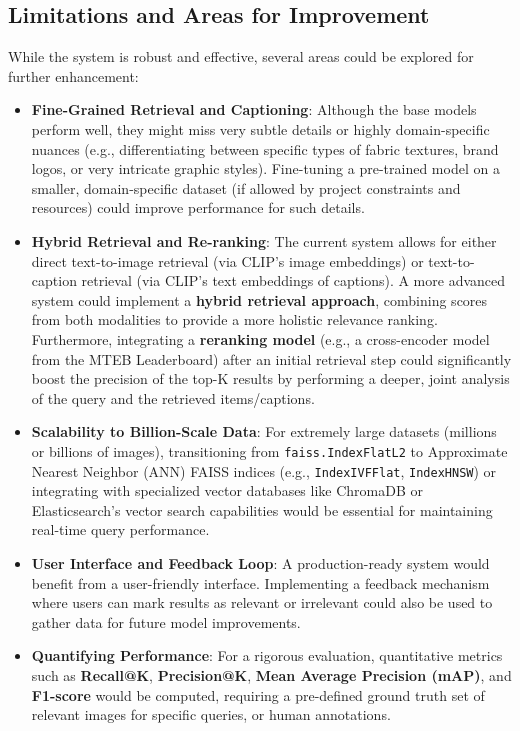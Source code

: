 \documentclass{article}
\begin{document}
\subsection{Limitations and Areas for Improvement}
While the system is robust and effective, several areas could be explored for further enhancement:
\begin{itemize}
    \item \textbf{Fine-Grained Retrieval and Captioning}: Although the base models perform well, they might miss very subtle details or highly domain-specific nuances (e.g., differentiating between specific types of fabric textures, brand logos, or very intricate graphic styles). Fine-tuning a pre-trained model on a smaller, domain-specific dataset (if allowed by project constraints and resources) could improve performance for such details.
    \item \textbf{Hybrid Retrieval and Re-ranking}: The current system allows for either direct text-to-image retrieval (via CLIP's image embeddings) or text-to-caption retrieval (via CLIP's text embeddings of captions). A more advanced system could implement a \textbf{hybrid retrieval approach}, combining scores from both modalities to provide a more holistic relevance ranking. Furthermore, integrating a \textbf{reranking model} (e.g., a cross-encoder model from the MTEB Leaderboard) after an initial retrieval step could significantly boost the precision of the top-K results by performing a deeper, joint analysis of the query and the retrieved items/captions.
    \item \textbf{Scalability to Billion-Scale Data}: For extremely large datasets (millions or billions of images), transitioning from \texttt{faiss.IndexFlatL2} to Approximate Nearest Neighbor (ANN) FAISS indices (e.g., \texttt{IndexIVFFlat}, \texttt{IndexHNSW}) or integrating with specialized vector databases like ChromaDB or Elasticsearch's vector search capabilities would be essential for maintaining real-time query performance.
    \item \textbf{User Interface and Feedback Loop}: A production-ready system would benefit from a user-friendly interface. Implementing a feedback mechanism where users can mark results as relevant or irrelevant could also be used to gather data for future model improvements.
    \item \textbf{Quantifying Performance}: For a rigorous evaluation, quantitative metrics such as \textbf{Recall@K}, \textbf{Precision@K}, \textbf{Mean Average Precision (mAP)}, and \textbf{F1-score} would be computed, requiring a pre-defined ground truth set of relevant images for specific queries, or human annotations.
\end{itemize}
\end{document}
